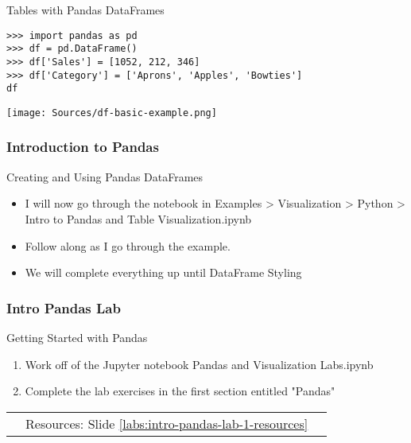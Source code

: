 \documentclass[handout, 11pt]{beamer}
\begin{document}
\begin{section}[Pandas]{Tables with Pandas DataFrames}
\begin{frame}[fragile]
\begin{verbatim}
>>> import pandas as pd
>>> df = pd.DataFrame()
>>> df['Sales'] = [1052, 212, 346]
>>> df['Category'] = ['Aprons', 'Apples', 'Bowties']
df

\end{verbatim}
\texttt{[image: Sources/df-basic-example.png]}
\end{frame}
\begin{frame}
\frametitle{Introduction to Pandas}
{
\begin{block}{Creating and Using Pandas DataFrames}
\begin{itemize}
\item I will now go through the notebook in Examples > Visualization > Python > Intro to Pandas and Table Visualization.ipynb
\item Follow along as I go through the example.
\item We will complete everything up until DataFrame Styling
\end{itemize}
\end{block}
}
\end{frame}
\begin{frame}
\frametitle{Intro Pandas Lab}
{
\begin{block}{Getting Started with Pandas}
\begin{enumerate}
\item Work off of the Jupyter notebook Pandas and Visualization Labs.ipynb
\item Complete the lab exercises in the first section entitled "Pandas"
\end{enumerate}
\vfill
\begin{tabular*}{\textwidth}{@{\extracolsep{\fill}}ccc}
\toprule
\hfill & Resources: Slide \textcolor{blue}{\underline{\ref{labs:intro-pandas-lab-1-resources}}} & \hfill\\


\end{tabular*}
\end{block}}
\end{frame}
\end{section}
\end{document}
